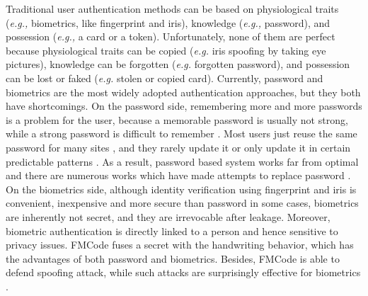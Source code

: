 \documentclass[conference]{IEEEtran}
\begin{document}
Traditional user authentication methods can be based on physiological traits (\textit{e.g.,} biometrics, like fingerprint and iris), knowledge (\textit{e.g.,} password), and possession (\textit{e.g.,} a card or a token). Unfortunately, none of them are perfect because physiological traits can be copied (\textit{e.g.} iris spoofing by taking eye pictures), knowledge can be forgotten (\textit{e.g.} forgotten password), and possession can be lost or faked (\textit{e.g.} stolen or copied card). Currently, password and biometrics are the most widely adopted authentication approaches, but they both have shortcomings. On the password side, remembering more and more passwords is a problem for the user, because a memorable password is usually not strong, while a strong password is difficult to remember \cite{PasswordHabit}. Most users just reuse the same password for many sites \cite{PasswordReuse}, and they rarely update it or only update it in certain predictable patterns \cite{PasswordUpdate}. As a result, password based system works far from optimal and there are numerous works which have made attempts to replace password \cite{Compare, Quest}. On the biometrics side, although identity verification using fingerprint \cite{Fingerprint} and iris \cite{Iris} is convenient, inexpensive and more secure than password in some cases, biometrics are inherently not secret, and they are irrevocable after leakage. Moreover, biometric authentication is directly linked to a person and hence sensitive to privacy issues. FMCode fuses a secret with the handwriting behavior, which has the advantages of both password and biometrics. Besides, FMCode is able to defend spoofing attack, while such attacks are surprisingly effective for biometrics \cite{FingerprintSpoofing}.
\end{document}
